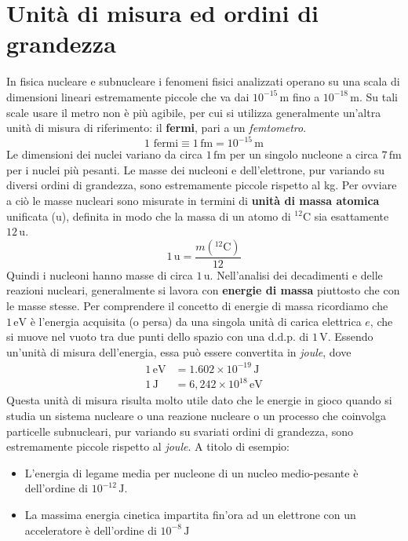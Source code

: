 \section{Unità di misura ed ordini di grandezza}
In fisica nucleare e subnucleare i fenomeni fisici analizzati operano su una scala di dimensioni lineari estremamente piccole che va dai $10^{-15} \, \mathrm{m}$ fino a $10^{-18} \, \mathrm{m}$. Su tali scale usare il metro non è più agibile, per cui si utilizza generalmente un'altra unità di misura di riferimento: il \textbf{fermi}, pari a un \textit{femtometro}.
    \begin{equation*}
        \text{1 fermi} \equiv 1 \, \mathrm{fm} = 10^{-15} \, \mathrm{m}
    \end{equation*}
Le dimensioni dei nuclei variano da circa $1 \, \mathrm{fm}$ per un singolo nucleone a circa $7 \, \mathrm{fm}$ per i nuclei più pesanti. Le masse dei nucleoni e dell'elettrone, pur variando su diversi ordini di grandezza, sono estremamente piccole rispetto al kg. Per ovviare a ciò le masse nucleari sono misurate in termini di \textbf{unità di massa atomica} unificata ($\mathrm{u}$), definita in modo che la massa di un atomo di ${}^{12} \text{C}$ sia esattamente $12 \, \mathrm{u}$.
    \begin{equation*}
        1 \, \mathrm{u} = \frac{m({}^{12} \text{C})}{12}
    \end{equation*}
Quindi i nucleoni hanno masse di circa $1 \, \mathrm{u}$. Nell'analisi dei decadimenti e delle reazioni nucleari, generalmente si lavora con \textbf{energie di massa} piuttosto che con le masse stesse. Per comprendere il concetto di energie di massa ricordiamo che $1 \, \mathrm{eV}$ è l'energia acquisita (o persa) da una singola unità di carica elettrica $e$, che si muove nel vuoto tra due punti dello spazio con una d.d.p. di $1 \, \mathrm{V}$. Essendo un'unità di misura dell'energia, essa può essere convertita in \textit{joule}, dove
    \begin{align*}
        1 \, \mathrm{eV} & = 1.602 \times 10^{-19} \, \mathrm{J} \\
        1 \, \mathrm{J} & = 6,242 \times 10^{18} \, \mathrm{eV} 
    \end{align*}
Questa unità di misura risulta molto utile dato che le energie in gioco quando si studia un sistema nucleare o una reazione nucleare o un processo che coinvolga particelle subnucleari, pur variando su svariati ordini di grandezza, sono estremamente piccole rispetto al \textit{joule}. A titolo di esempio:
    \begin{itemize}
        \item L'energia di legame media per nucleone di un nucleo medio-pesante è dell'ordine di $10^{-12} \, \mathrm{J}$.
        \item La massima energia cinetica impartita fin'ora ad un elettrone con un acceleratore è dell'ordine di $10^{-8} \, \mathrm{J}$
    \end{itemize}
